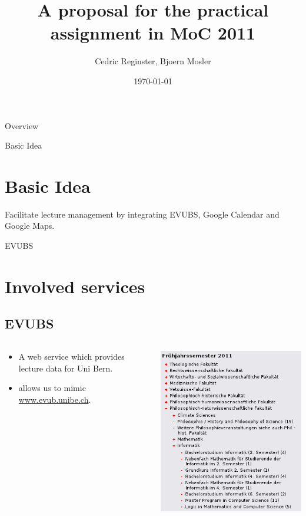 \documentclass{beamer}
\title[Integrated Lecture Management]{A proposal for the practical assignment in MoC 2011}
\date{\today}
\institute{IAM}
\author{Cedric Reginster, Bjoern Mosler}
\begin{document}
\begin{frame}
	\titlepage
\end{frame}


\begin{frame}{Overview}
	\tableofcontents
\end{frame}

\begin{frame}{Basic Idea}

	\section{Basic Idea}
	Facilitate lecture management by integrating EVUBS, Google Calendar and Google Maps.

\end{frame}

\begin{frame}{EVUBS}

	\section{Involved services}
	\subsection{EVUBS}

	\begin{columns}
		\begin{column}{0.5\textwidth}
			\begin{itemize}
				\item A web service which provides lecture data for Uni Bern.
				\item allows us to mimic \url{www.evub.unibe.ch}.
			\end{itemize}
		\end{column}

		\begin{column}{0.5\textwidth}
			\includegraphics[scale=0.5]{evub.png} 
		\end{column}
	\end{columns}

\end{frame}
\end{document}
